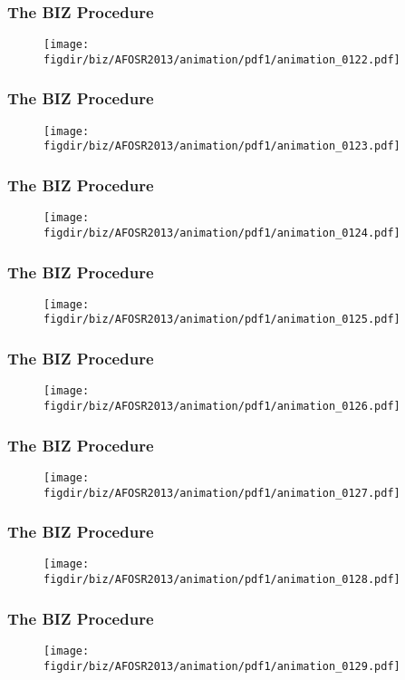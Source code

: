 \documentclass[13pt]{beamer}
\newcommand{\figdir}{../../fig}
\begin{document}
{\begin{frame}\frametitle{The BIZ Procedure}\begin{figure}\texttt{[image: \\figdir/biz/AFOSR2013/animation/pdf1/animation\_0122.pdf]}\end{figure}\end{frame}
\begin{frame}\frametitle{The BIZ Procedure}\begin{figure}\texttt{[image: \\figdir/biz/AFOSR2013/animation/pdf1/animation\_0123.pdf]}\end{figure}\end{frame}
\begin{frame}\frametitle{The BIZ Procedure}\begin{figure}\texttt{[image: \\figdir/biz/AFOSR2013/animation/pdf1/animation\_0124.pdf]}\end{figure}\end{frame}
\begin{frame}\frametitle{The BIZ Procedure}\begin{figure}\texttt{[image: \\figdir/biz/AFOSR2013/animation/pdf1/animation\_0125.pdf]}\end{figure}\end{frame}
\begin{frame}\frametitle{The BIZ Procedure}\begin{figure}\texttt{[image: \\figdir/biz/AFOSR2013/animation/pdf1/animation\_0126.pdf]}\end{figure}\end{frame}
\begin{frame}\frametitle{The BIZ Procedure}\begin{figure}\texttt{[image: \\figdir/biz/AFOSR2013/animation/pdf1/animation\_0127.pdf]}\end{figure}\end{frame}
\begin{frame}\frametitle{The BIZ Procedure}\begin{figure}\texttt{[image: \\figdir/biz/AFOSR2013/animation/pdf1/animation\_0128.pdf]}\end{figure}\end{frame}
\begin{frame}\frametitle{The BIZ Procedure}\begin{figure}\texttt{[image: \\figdir/biz/AFOSR2013/animation/pdf1/animation\_0129.pdf]}\end{figure}\end{frame}
}
\end{document}
